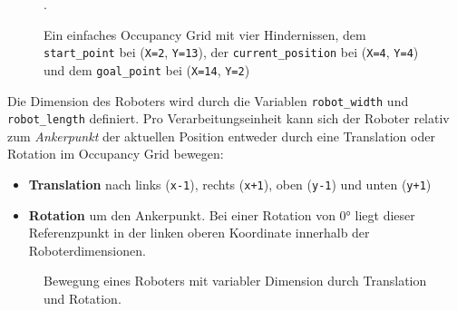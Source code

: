 \begin{figure}[H]
\begin{minipage}{0.35\textwidth}
	\end{minipage}
	\hspace*{\fill}
	\caption{Ein einfaches Occupancy Grid mit vier Hindernissen, dem \texttt{start\_point} bei (\texttt{X=2}, \texttt{Y=13}), der \texttt{current\_position} bei (\texttt{X=4}, \texttt{Y=4}) und dem \texttt{goal\_point} bei (\texttt{X=14}, \texttt{Y=2})}.
\end{figure}

\vspace*{-0.3cm}
Die Dimension des Roboters wird durch die Variablen \texttt{robot\_width} und \texttt{robot\_length} definiert. Pro Verarbeitungseinheit kann sich der Roboter relativ zum \textit{Ankerpunkt} der aktuellen Position entweder durch eine Translation oder Rotation im Occupancy Grid bewegen:
\begin{itemize}
\item \textbf{Translation} nach links (\texttt{x-1}), rechts (\texttt{x+1}), oben (\texttt{y-1}) und unten (\texttt{y+1})
\item \textbf{Rotation} um den Ankerpunkt. Bei einer Rotation von $0$° liegt dieser Referenzpunkt in der linken oberen Koordinate innerhalb der Roboterdimensionen.
\end{itemize}
\vspace*{0.3cm}
\begin{figure}[H]
	\centering
	\footnotesize
	\centerline{\resizebox{1\linewidth}{!}{}}
	\caption{Bewegung eines Roboters mit variabler Dimension durch Translation und Rotation.}
\end{figure}

